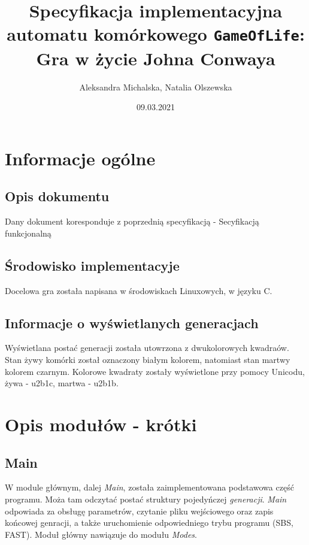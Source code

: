 \documentclass{article}
\title{Specyfikacja implementacyjna automatu kom\'orkowego \texttt{GameOfLife}:
	Gra w \.zycie Johna Conwaya}
\author{Aleksandra Michalska, Natalia Olszewska}
\date{09.03.2021}
\begin{document}
\begin{titlepage}
	\maketitle
\end{titlepage}

\section{Informacje og\'olne}

\subsection{Opis dokumentu}

\quad Dany dokument koresponduje z poprzedni\k{a} specyfikacj\k{a} - Secyfikacj\k{a} funkcjonaln\k{a}

\subsection{\'Srodowisko implementacyje}
\quad Docelowa gra zosta\l{}a napisana w \'srodowiskach Linuxowych, w j\k{e}zyku C. 


\subsection{Informacje o wy\'swietlanych generacjach}

\quad Wy\'swietlana posta\'c generacji zosta\l{}a utowrzona z dwukolorowych kwadra\'ow. 
Stan \.zywy kom\'orki zosta\l{} oznaczony bia\l{}ym kolorem, natomiast stan martwy kolorem czarnym. 
Kolorowe kwadraty zosta\l{}y wy\'swietlone przy pomocy Unicodu, \.zywa - u2b1c, martwa - u2b1b. 

\section{Opis modu\l{}\'ow - kr\'otki}

\subsection{Main}

\quad W module g\l{}\'ownym, dalej \textit{Main}, zosta\l{}a zaimplementowana podstawowa cz\k{e}\'s\'c programu. 
Mo\.za tam odczyta\'c posta\'c struktury pojedy\'nczej \textit{generacji}. 
\textit{Main} odpowiada za obs\l{}ug\k{e} parametr\'ow, czytanie pliku wej\'sciowego oraz zapis ko\'ncowej genracji, a tak\.ze uruchomienie odpowiedniego trybu programu (SBS, FAST). 
Modu\l{} g\l{}\'owny nawi\k{a}zuje do modu\l{}u \textit{Modes}.  
\end{document}
